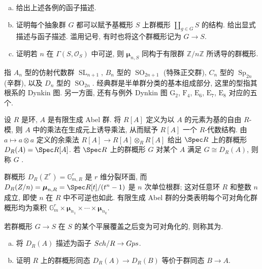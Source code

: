 \begin{exercise}\label{src:B.1.5}
\begin{enumerate}[(a)]
\item 给出上述各例的函子描述.
\item 证明每个抽象群 $G$ 都可以赋予基概形 $S$ 上群概形 $\coprod_{g\in G}S$ 的结构. 给出显式描述与函子描述. 滥用记号, 有时也将这个群概形记为 $G\to S$.
\item 证明若 $n$ 在 $\Gamma(S,\mathcal O_S)$ 中可逆, 则 $\boldsymbol\mu_{n,S}$ 同构于有限群 $\mathbb Z/n\mathbb Z$ 所诱导的群概形.
\end{enumerate}
\end{exercise}
\begin{remark}[经典群与例外群]\label{src:B.1.6}
 指 $A_n$ 型的仿射代数群 $\operatorname{SL}_{n+1}$, $B_n$ 型的 $\operatorname{SO}_{2n+1}$ (特殊正交群), $C_n$ 型的 $\operatorname{Sp}_{2n}$ (辛群), 以及 $D_n$ 型的 $\operatorname{SO}_{2n}$. 经典群是半单群分类的基本组成部分, 这里的型指其根系的 Dynkin 图. 另一方面, 还有与例外 Dynkin 图 $\mathrm G_2$, $\mathrm F_4$, $\mathrm E_6$, $\mathrm E_7$, $\mathrm E_8$ 对应的五个.
\end{remark}
\begin{example}[可对角化群概形]\label{src:B.1.7}
设 $R$ 是环, $A$ 是有限生成 Abel 群. 将 $R[A]$ 定义为以 $A$ 的元素为基的自由 $R$-模, 则 $A$ 中的乘法在生成元上诱导乘法, 从而赋予 $R[A]$ 一个 $R$-代数结构. 由 $a\mapsto a\otimes a$ 定义的余乘法 $R[A]\to R[A]\otimes_R R[A]$ 给出 $\Spec R$ 上的群概形 $D_R(A)=\Spec R[A]$. 若 $\Spec R$ 上的群概形 $G$ 对某个 $A$ 满足 $G\cong D_R(A)$, 则称 $G$ .

群概形 $D_R(\mathbb Z^r)=\mathbb G_{m,R}^r$ 是 $r$ 维分裂环面, 而 $D_R(\mathbb Z/n)=\boldsymbol\mu_{n,R}=\Spec R[t]/(t^n-1)$ 是 $n$ 次单位根群; 这对任意环 $R$ 和整数 $n$ 成立, 即使 $n$ 在 $R$ 中不可逆也如此. 有限生成 Abel 群的分类表明每个可对角化群概形均为乘积 $\mathbb G_m^r\times\boldsymbol\mu_{n_1}\times\cdots\times\boldsymbol\mu_{n_k}$.

若群概形 $G\to S$ 在 $S$ 的某个平展覆盖之后变为可对角化的, 则称其为.
\end{example}
\begin{exercise}\label{src:B.1.8}
\begin{enumerate}[(a)]
\item 将 $D_R(A)$ 描述为函子 $Sch/R\to Gps$.
\item 证明 $R$ 上的群概形同态 $D_R(A)\to D_R(B)$ 等价于群同态 $B\to A$.
\end{enumerate}
\end{exercise}
